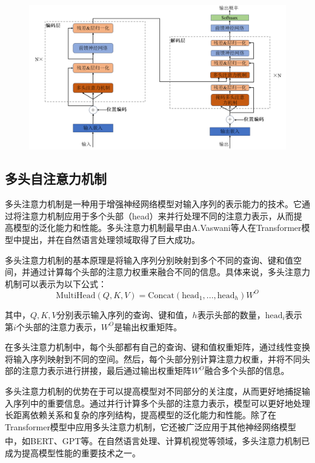 \begin{figure}[h]
	\centering 
	\includegraphics[width=15cm]{fig/ch2/vit1.png}
	\label{fig:vit1}
\end{figure}

\subsection{多头自注意力机制}
多头注意力机制是一种用于增强神经网络模型对输入序列的表示能力的技术。它通过将注意力机制应用于多个头部（head）来并行处理不同的注意力表示，从而提高模型的泛化能力和性能。多头注意力机制最早由A.Vaswani等人在Transformer模型中提出，并在自然语言处理领域取得了巨大成功。

多头注意力机制的基本原理是将输入序列分别映射到多个不同的查询、键和值空间，并通过计算每个头部的注意力权重来融合不同的信息。具体来说，多头注意力机制可以表示为以下公式：
\begin{equation}
	\text{MultiHead}(Q, K, V) = \text{Concat}(\text{head}_1, ..., \text{head}_h)W^O
\end{equation}



其中，$Q, K, V$分别表示输入序列的查询、键和值，$h$表示头部的数量，$\text{head}_i$表示第$i$个头部的注意力表示，$W^O$是输出权重矩阵。

在多头注意力机制中，每个头部都有自己的查询、键和值权重矩阵，通过线性变换将输入序列映射到不同的空间。然后，每个头部分别计算注意力权重，并将不同头部的注意力表示进行拼接，最后通过输出权重矩阵$W^O$融合多个头部的信息。

多头注意力机制的优势在于可以提高模型对不同部分的关注度，从而更好地捕捉输入序列中的重要信息。通过并行计算多个头部的注意力表示，模型可以更好地处理长距离依赖关系和复杂的序列结构，提高模型的泛化能力和性能。除了在Transformer模型中应用多头注意力机制，它还被广泛应用于其他神经网络模型中，如BERT\textsuperscript{\cite{kenton2019bert}}、GPT\textsuperscript{\cite{floridi2020gpt}}等。在自然语言处理、计算机视觉等领域，多头注意力机制已成为提高模型性能的重要技术之一。
 
